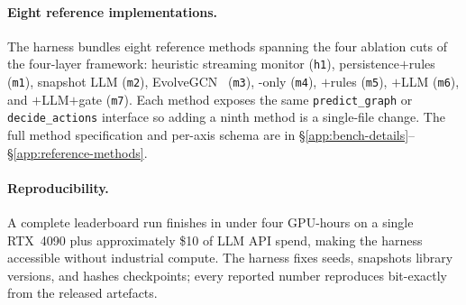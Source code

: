 \paragraph{Eight reference implementations.}
The harness bundles eight reference methods spanning the four
ablation cuts of the four-layer framework: heuristic streaming
monitor (\texttt{h1}), persistence$+$rules (\texttt{m1}), snapshot
LLM (\texttt{m2}), EvolveGCN~\citep{ParejaEtAl2020EvolveGCN}
(\texttt{m3}), \fmname-only (\texttt{m4}),
\fmname$+$rules (\texttt{m5}), \fmname$+$LLM
(\texttt{m6}), and \fmname$+$LLM$+$gate (\texttt{m7}). Each
method exposes the same \texttt{predict\_graph} or
\texttt{decide\_actions} interface so adding a ninth method is a
single-file change. The full method specification and per-axis
schema are in \S\ref{app:bench-details}--\S\ref{app:reference-methods}.

\paragraph{Reproducibility.}
A complete leaderboard run finishes in under four GPU-hours on a
single RTX~4090 plus approximately \$10 of LLM API spend, making the
harness accessible without industrial compute. The harness fixes
seeds, snapshots library versions, and hashes checkpoints; every
reported number reproduces bit-exactly from the released
artefacts.
